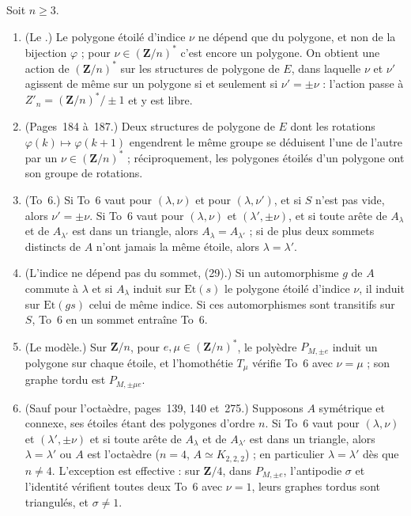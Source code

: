 \begin{encadre}
\begin{theoreme}
Soit $n \geq 3$.
\begin{enumerate}
\item (Le .) Le polygone étoilé d'indice $\nu$ ne dépend que du polygone, et non de la bijection $\varphi$ ; pour $\nu \in (\mathbf Z/n)^*$ c'est encore un polygone. On obtient une action de $(\mathbf Z/n)^*$ sur les structures de polygone de $E$, dans laquelle $\nu$ et $\nu'$ agissent de même sur un polygone si et seulement si $\nu' = \pm\nu$ : l'action passe à $Z'_n = (\mathbf Z/n)^*/\pm 1$ et y est libre.
\item (Pages~184 à~187.) Deux structures de polygone de $E$ dont les rotations $\varphi(k) \mapsto \varphi(k + 1)$ engendrent le même groupe se déduisent l'une de l'autre par un $\nu \in (\mathbf Z/n)^*$ ; réciproquement, les polygones étoilés d'un polygone ont son groupe de rotations.
\item (To~6.) Si To~6 vaut pour $(\lambda, \nu)$ et pour $(\lambda, \nu')$, et si $S$ n'est pas vide, alors $\nu' = \pm\nu$. Si To~6 vaut pour $(\lambda, \nu)$ et $(\lambda', \pm\nu)$, et si toute arête de $A_\lambda$ et de $A_{\lambda'}$ est dans un triangle, alors $A_\lambda = A_{\lambda'}$ ; si de plus deux sommets distincts de $A$ n'ont jamais la même étoile, alors $\lambda = \lambda'$.
\item (L'indice ne dépend pas du sommet, (29).) Si un automorphisme $g$ de $A$ commute à $\lambda$ et si $A_\lambda$ induit sur $\mathrm{Et}(s)$ le polygone étoilé d'indice $\nu$, il induit sur $\mathrm{Et}(gs)$ celui de même indice. Si ces automorphismes sont transitifs sur $S$, To~6 en un sommet entraîne To~6.
\item (Le modèle.) Sur $\mathbf Z/n$, pour $e, \mu \in (\mathbf Z/n)^*$, le polyèdre $P_{M, \pm e}$ induit un polygone sur chaque étoile, et l'homothétie $T_\mu$ vérifie To~6 avec $\nu = \mu$ ; son graphe tordu est $P_{M, \pm\mu e}$.
\item (Sauf pour l'octaèdre, pages~139, 140 et~275.) Supposons $A$ symétrique et connexe, ses étoiles étant des polygones d'ordre $n$. Si To~6 vaut pour $(\lambda, \nu)$ et $(\lambda', \pm\nu)$ et si toute arête de $A_\lambda$ et de $A_{\lambda'}$ est dans un triangle, alors $\lambda = \lambda'$ ou $A$ est l'octaèdre ($n = 4$, $A \simeq K_{2,2,2}$) ; en particulier $\lambda = \lambda'$ dès que $n \neq 4$. L'exception est effective : sur $\mathbf Z/4$, dans $P_{M, \pm e}$, l'antipodie $\sigma$ et l'identité vérifient toutes deux To~6 avec $\nu = 1$, leurs graphes tordus sont triangulés, et $\sigma \neq 1$.
\end{enumerate}
\end{theoreme}
\end{encadre}

